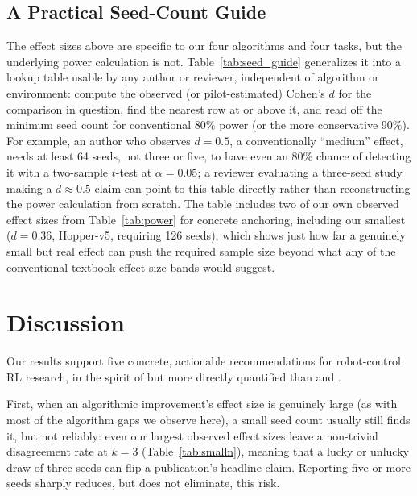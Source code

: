 \documentclass[journal]{IEEEtran}
\begin{document}


\subsection{A Practical Seed-Count Guide}
\label{sec:seed_guide}

The effect sizes above are specific to our four algorithms and four tasks, but the underlying
power calculation is not. Table~\ref{tab:seed_guide} generalizes it into a lookup table usable by
any author or reviewer, independent of algorithm or environment: compute the observed (or
pilot-estimated) Cohen's $d$ for the comparison in question, find the nearest row at or above it,
and read off the minimum seed count for conventional 80\% power (or the more conservative 90\%).
For example, an author who observes $d=0.5$, a conventionally ``medium'' effect, needs at least 64
seeds, not three or five, to have even an 80\% chance of detecting it with a two-sample $t$-test at
$\alpha=0.05$; a reviewer evaluating a three-seed study making a $d\approx0.5$ claim can point to
this table directly rather than reconstructing the power calculation from scratch. The table
includes two of our own observed effect sizes from Table~\ref{tab:power} for concrete anchoring,
including our smallest ($d=0.36$, Hopper-v5, requiring 126 seeds), which shows just how far a
genuinely small but real effect can push the required sample size beyond what any of the
conventional textbook effect-size bands would suggest.



\section{Discussion}

Our results support five concrete, actionable recommendations for robot-control RL research, in
the spirit of but more directly quantified than \cite{henderson2018deep} and
\cite{colas2018many}.

First, when an algorithmic improvement's effect size is genuinely large (as with most of the
algorithm gaps we observe here), a small seed count usually still finds it, but not reliably: even
our largest observed effect sizes leave a non-trivial disagreement rate at $k=3$
(Table~\ref{tab:smalln}), meaning that a lucky or unlucky draw of three seeds can flip a
publication's headline claim. Reporting five or more seeds sharply reduces, but does not
eliminate, this risk.
\end{document}
